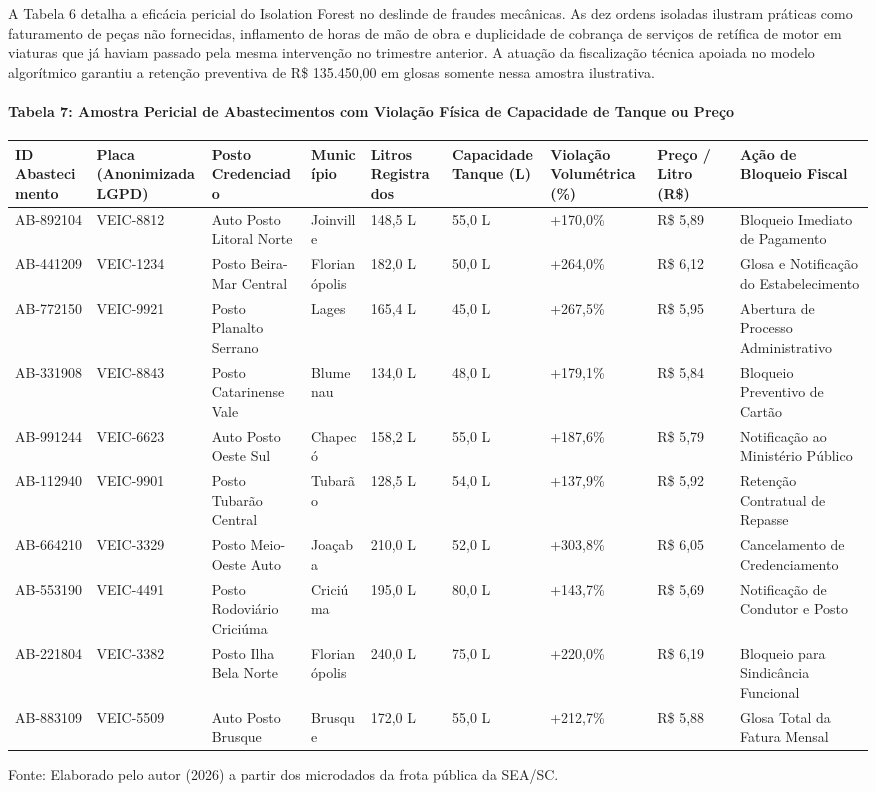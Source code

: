 \documentclass[10pt,a4paper,journal]{article}
\begin{document}
A Tabela 6 detalha a eficácia pericial do Isolation Forest no deslinde de fraudes mecânicas. As dez ordens isoladas ilustram práticas como faturamento de peças não fornecidas, inflamento de horas de mão de obra e duplicidade de cobrança de serviços de retífica de motor em viaturas que já haviam passado pela mesma intervenção no trimestre anterior. A atuação da fiscalização técnica apoiada no modelo algorítmico garantiu a retenção preventiva de R\$ 135.450,00 em glosas somente nessa amostra ilustrativa.

\paragraph{Tabela 7: Amostra Pericial de Abastecimentos com Violação Física de Capacidade de Tanque ou Preço}
\begin{table}[htbp]
\centering
\small
\begin{tabular}{lllllllll}
\toprule
ID Abastecimento & Placa (Anonimizada LGPD) & Posto Credenciado & Município & Litros Registrados & Capacidade Tanque (L) & Violação Volumétrica (\%) & Preço / Litro (R\$) & Ação de Bloqueio Fiscal \\
\midrule
AB-892104 & VEIC-8812 & Auto Posto Litoral Norte & Joinville & 148,5 L & 55,0 L & +170,0\% & R\$ 5,89 & Bloqueio Imediato de Pagamento \\
AB-441209 & VEIC-1234 & Posto Beira-Mar Central & Florianópolis & 182,0 L & 50,0 L & +264,0\% & R\$ 6,12 & Glosa e Notificação do Estabelecimento \\
AB-772150 & VEIC-9921 & Posto Planalto Serrano & Lages & 165,4 L & 45,0 L & +267,5\% & R\$ 5,95 & Abertura de Processo Administrativo \\
AB-331908 & VEIC-8843 & Posto Catarinense Vale & Blumenau & 134,0 L & 48,0 L & +179,1\% & R\$ 5,84 & Bloqueio Preventivo de Cartão \\
AB-991244 & VEIC-6623 & Auto Posto Oeste Sul & Chapecó & 158,2 L & 55,0 L & +187,6\% & R\$ 5,79 & Notificação ao Ministério Público \\
AB-112940 & VEIC-9901 & Posto Tubarão Central & Tubarão & 128,5 L & 54,0 L & +137,9\% & R\$ 5,92 & Retenção Contratual de Repasse \\
AB-664210 & VEIC-3329 & Posto Meio-Oeste Auto & Joaçaba & 210,0 L & 52,0 L & +303,8\% & R\$ 6,05 & Cancelamento de Credenciamento \\
AB-553190 & VEIC-4491 & Posto Rodoviário Criciúma & Criciúma & 195,0 L & 80,0 L & +143,7\% & R\$ 5,69 & Notificação de Condutor e Posto \\
AB-221804 & VEIC-3382 & Posto Ilha Bela Norte & Florianópolis & 240,0 L & 75,0 L & +220,0\% & R\$ 6,19 & Bloqueio para Sindicância Funcional \\
AB-883109 & VEIC-5509 & Auto Posto Brusque & Brusque & 172,0 L & 55,0 L & +212,7\% & R\$ 5,88 & Glosa Total da Fatura Mensal \\
\bottomrule
\end{tabular}
\end{table}
Fonte: Elaborado pelo autor (2026) a partir dos microdados da frota pública da SEA/SC.
\end{document}
